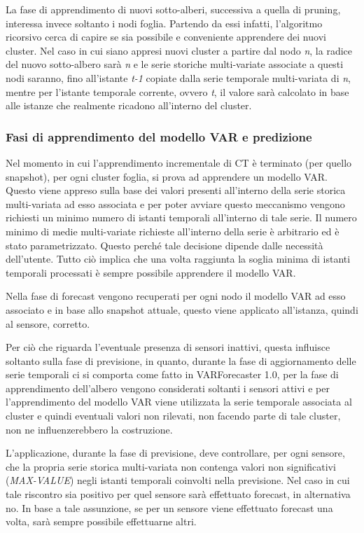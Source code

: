 \documentclass[12pt,a4paper,oneside,openright]{book}
\begin{document}
La fase di apprendimento di nuovi sotto-alberi, successiva a quella di pruning, interessa invece soltanto i nodi foglia. Partendo da essi infatti, l'algoritmo ricorsivo cerca di capire se sia possibile e conveniente apprendere dei nuovi cluster.
Nel caso in cui siano appresi nuovi cluster a partire dal nodo \textit{n}, la radice del nuovo sotto-albero sarà \textit{n} e le serie storiche multi-variate associate a questi nodi saranno, fino all'istante \textit{t-1} copiate dalla serie temporale multi-variata di \textit{n}, mentre per l'istante temporale corrente, ovvero \textit{t}, il valore sarà calcolato in base alle istanze che realmente ricadono all'interno del cluster.  
\subsubsection{Fasi di apprendimento del modello VAR e predizione}
Nel momento in cui l'apprendimento incrementale di CT è terminato (per quello snapshot), per ogni cluster foglia, si prova ad apprendere un modello VAR. Questo viene appreso sulla base dei valori presenti all'interno della serie storica multi-variata ad esso associata e per poter avviare questo meccanismo vengono richiesti un minimo numero di istanti temporali all'interno di tale serie. Il numero minimo di medie multi-variate richieste all'interno della serie è arbitrario ed è stato parametrizzato. Questo perché tale decisione dipende dalle necessità dell'utente. Tutto ciò implica che una volta raggiunta la soglia minima di istanti temporali processati è sempre possibile apprendere il modello VAR.

Nella fase di forecast vengono recuperati per ogni nodo il modello VAR ad esso associato e in base allo snapshot attuale, questo viene applicato all'istanza, quindi al sensore, corretto. 

Per ciò che riguarda l'eventuale presenza di sensori inattivi, questa influisce soltanto sulla fase di previsione, in quanto, durante la fase di aggiornamento delle serie temporali ci si comporta come fatto in VARForecaster 1.0, per la fase di apprendimento dell'albero vengono considerati soltanti i sensori attivi e per l'apprendimento del modello VAR viene utilizzata la serie temporale associata al cluster e quindi eventuali valori non rilevati, non facendo parte di tale cluster, non ne influenzerebbero la costruzione. 

L'applicazione, durante la fase di previsione, deve controllare, per ogni sensore, che la propria serie storica multi-variata non contenga valori non significativi (\textit{MAX-VALUE}) negli istanti temporali coinvolti nella previsione. Nel caso in cui tale riscontro sia positivo per quel sensore sarà effettuato forecast, in alternativa no. In base a tale assunzione, se per un sensore viene effettuato forecast una volta, sarà sempre possibile effettuarne altri.
\end{document}

